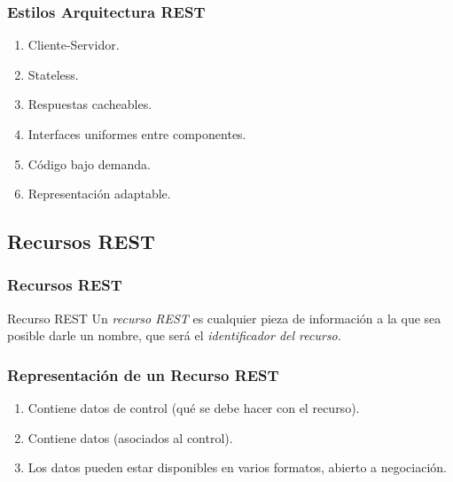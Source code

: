 \documentclass[a4paper,slidestop,xcolor=pst,blue]{beamer}
\begin{document}
\begin{frame}[c]
	\frametitle{Estilos Arquitectura REST}
    \begin{enumerate}[<+->]
        \item Cliente-Servidor.
        \item Stateless.
        \item Respuestas cacheables.
        \item Interfaces uniformes entre componentes.
        \item Código bajo demanda.
        \item Representación adaptable.
    \end{enumerate}
\end{frame}

\subsection{Recursos REST}

\begin{frame}[c]
	\frametitle{Recursos REST}
    \begin{block}{Recurso REST}
        Un \emph{recurso REST} es cualquier pieza de información a la que sea posible darle un nombre, que será el \emph{identificador del recurso}.
    \end{block}
\end{frame}

\begin{frame}[c]
	\frametitle{Representación de un Recurso REST}
    \begin{enumerate}
        \item Contiene datos de control (qué se debe hacer con el recurso).
        \item Contiene datos (asociados al control).
        \item Los datos pueden estar disponibles en varios formatos, abierto a negociación.
    \end{enumerate}
\end{frame}
\end{document}
